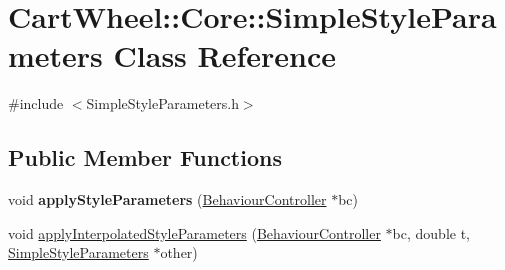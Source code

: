 \hypertarget{classCartWheel_1_1Core_1_1SimpleStyleParameters}{
\section{CartWheel::Core::SimpleStyleParameters Class Reference}
\label{classCartWheel_1_1Core_1_1SimpleStyleParameters}
}


{\ttfamily \#include $<$SimpleStyleParameters.h$>$}

\subsection*{Public Member Functions}
\begin{DoxyCompactItemize}
\item 
\hypertarget{classCartWheel_1_1Core_1_1SimpleStyleParameters_a4fc3917feef53d0d1c33d82d894b632f}{
void {\bfseries applyStyleParameters} (\hyperlink{classCartWheel_1_1Core_1_1BehaviourController}{BehaviourController} $\ast$bc)}
\label{classCartWheel_1_1Core_1_1SimpleStyleParameters_a4fc3917feef53d0d1c33d82d894b632f}

\item 
void \hyperlink{classCartWheel_1_1Core_1_1SimpleStyleParameters_a48b321516cf94a37ca25e6bd2b5a3ac2}{applyInterpolatedStyleParameters} (\hyperlink{classCartWheel_1_1Core_1_1BehaviourController}{BehaviourController} $\ast$bc, double t, \hyperlink{classCartWheel_1_1Core_1_1SimpleStyleParameters}{SimpleStyleParameters} $\ast$other)
\end{DoxyCompactItemize}
